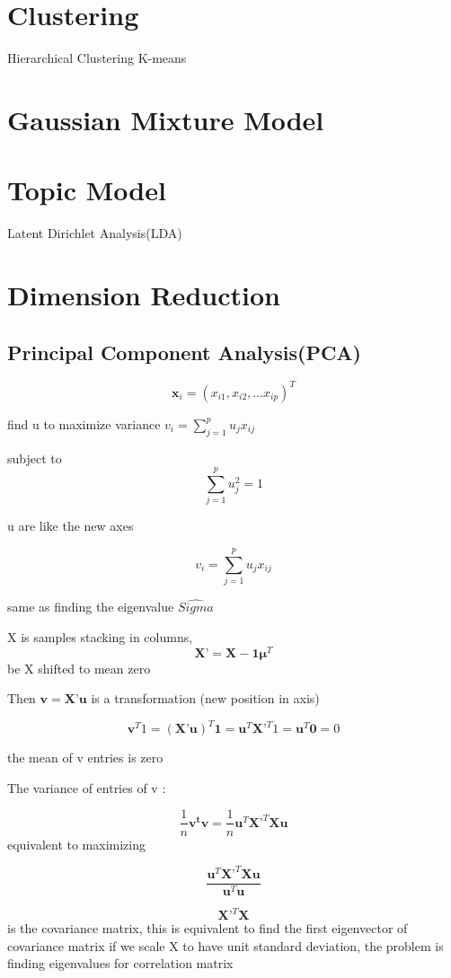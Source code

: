 \documentclass[11pt, openany]{book}              %
\begin{document}
\chapter{Clustering}
				Hierarchical Clustering
				K-means
\chapter{Gaussian Mixture Model}

\chapter{Topic Model}
Latent Dirichlet Analysis(LDA)


\chapter{Dimension Reduction}
\section{Principal Component Analysis(PCA)}

$$\mathbf{x}_i = (x_{i1},x_{i2},…x_{ip})^T$$

find u to maximize variance  $v_i = \sum_{j=1}^p u_j x_{ij}$

subject to $$\sum_{j=1}^p u_j^2 = 1$$

u are like the new axes 

$$v_i = \sum_{j=1}^p u_j x_{ij}$$

same as finding the eigenvalue $\hat{Sigma}$

X is samples stacking in columns,
 $$\mathbf{X}’ = \mathbf{X} - \mathbf{1}\mathbold{\mu}^T$$ be X shifted to mean zero

Then $\mathbf{v} = \mathbf{X}’ \mathbf{u}$ is a transformation (new position in axis)

$$\mathbf{v}^T 1 = (\mathbf{X}’\mathbf{u})^T \mathbf{1} = \mathbf{u}^T \mathbf{X}’^T 1 =  \mathbf{u}^T  \mathbf{0} = 0$$

the mean of v entries is zero 

The variance of entries of v : 

$$\frac{1}{n}\mathbf{v^tv} =  \frac{1}{n} \mathbf{u}^T\mathbf{X}’^T\mathbf{X} \mathbf{u}$$
equivalent to maximizing 

$$\frac{ \mathbf{u}^T\mathbf{X}’^T\mathbf{X} \mathbf{u}}{ \mathbf{u}^T \mathbf{u}}$$  

$$\mathbf{X}’^T\mathbf{X}$$ is the covariance matrix, this is equivalent to find the first eigenvector of covariance matrix
if we scale X to have unit standard deviation, the problem is finding eigenvalues for correlation matrix 
\end{document}
